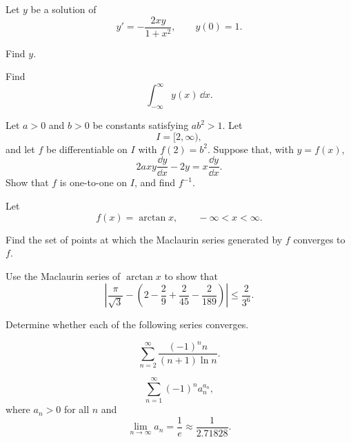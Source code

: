 \begin{problem}
Let $y$ be a solution of
\[
y'=-\frac{2xy}{1+x^2},
\qquad
y(0)=1.
\]
\begin{problemsubparts}
\item Find $y$.
\item Find
\[
\int_{-\infty}^{\infty}y(x)\,\dd x.
\]
\end{problemsubparts}
\end{problem}

\begin{problem}
Let $a>0$ and $b>0$ be constants satisfying $ab^2>1$. Let
\[
I=[2, \infty),
\]
and let $f$ be differentiable on $I$ with $f(2)=b^2$. Suppose that, with $y=f(x)$,
\[
2axy\frac{\dd y}{\dd x}-2y=x\frac{\dd y}{\dd x}.
\]
Show that $f$ is one-to-one on $I$, and find $f^{-1}$.
\end{problem}

\begin{problem}
Let
\[
f(x)=\arctan x,
\qquad -\infty<x<\infty.
\]
\begin{problemsubparts}
\item Find the set of points at which the Maclaurin series generated by $f$ converges to $f$.
\item Use the Maclaurin series of $\arctan x$ to show that
\[
\left|
\frac{\pi}{\sqrt3}
-\left(2-\frac29+\frac{2}{45}-\frac{2}{189}\right)
\right|
\le\frac{2}{3^6}.
\]
\end{problemsubparts}
\end{problem}

\begin{problem}
Determine whether each of the following series converges.
\begin{problemsubparts}
\item
\[
\sum_{n=2}^{\infty}\frac{(-1)^n n}{(n+1)\ln n}.
\]
\item
\[
\sum_{n=1}^{\infty}(-1)^n a_n^{a_n},
\]
where $a_n>0$ for all $n$ and
\[
\lim_{n\to\infty}a_n=\frac1e\approx\frac1{2.71828}.
\]
\end{problemsubparts}
\end{problem}


